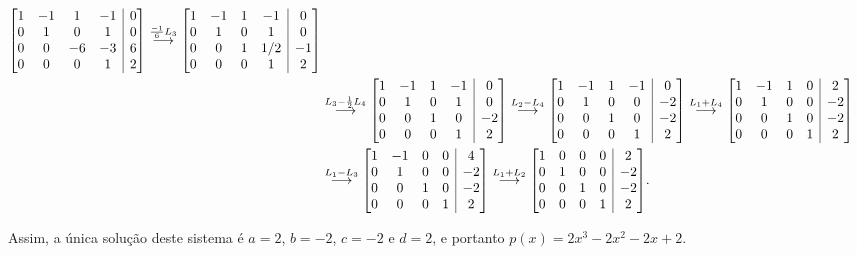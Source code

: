 \documentclass[12pt,a4paper]{article}
\makeatletter
\newenvironment{amatrix}[1]{%
  \left[\begin{array}{@{}*{#1}{c}|c@{}}
}{%
  \end{array}\right]
}
\newcommand{\grstep}[2][\relax]{%
   \ensuremath{\mathrel{
       {\mathop{\longrightarrow}\limits^{#2\mathstrut}_{
                                     \begin{subarray}{l} #1 \end{subarray}}}}}}
\makeatother
\begin{document}
\begin{enumerate}
\begin{align*}
\begin{amatrix}{4}
 1 & -1 & 1 & -1 & 0 \\
 0 &  1 & 0 &  1 & 0 \\
 0 &  0 & -6 & -3 & 6 \\
 0 &  0 & 0 &  1 & 2
\end{amatrix}
\grstep{ \frac{-1}{6}L_3 }
\begin{amatrix}{4}
 1 & -1 & 1 & -1 & 0 \\
 0 &  1 & 0 &  1 & 0 \\
 0 &  0 & 1 & 1/2 & -1 \\
 0 &  0 & 0 &  1 & 2
\end{amatrix}\\
&
\grstep{ L_3 - \frac{1}{2} L_4 }
\begin{amatrix}{4}
 1 & -1 & 1 & -1 & 0 \\
 0 &  1 & 0 &  1 & 0 \\
 0 &  0 & 1 &  0 & -2 \\
 0 &  0 & 0 &  1 & 2
\end{amatrix}
\grstep{ L_2 - L_4 }
\begin{amatrix}{4}
 1 & -1 & 1 & -1 & 0 \\
 0 &  1 & 0 &  0 & -2 \\
 0 &  0 & 1 &  0 & -2 \\
 0 &  0 & 0 &  1 & 2
\end{amatrix}
\grstep{ L_1 + L_4 }
\begin{amatrix}{4}
 1 & -1 & 1 & 0 & 2 \\
 0 &  1 & 0 & 0 & -2 \\
 0 &  0 & 1 & 0 & -2 \\
 0 &  0 & 0 & 1 & 2
\end{amatrix}\\
&
\grstep{ L_1 - L_3 }
\begin{amatrix}{4}
 1 & -1 & 0 & 0 & 4 \\
 0 &  1 & 0 & 0 & -2 \\
 0 &  0 & 1 & 0 & -2 \\
 0 &  0 & 0 & 1 & 2
\end{amatrix}
\grstep{ L_1 + L_2 }
\begin{amatrix}{4}
 1 & 0 & 0 & 0 & 2 \\
 0 & 1 & 0 & 0 & -2 \\
 0 & 0 & 1 & 0 & -2 \\
 0 & 0 & 0 & 1 & 2
\end{amatrix}.
\end{align*}


Assim, a única solução deste sistema é $a=2$, $b=-2$, $c=-2$ e $d=2$, e portanto $p(x) = 2x^3-2x^2-2x+2$.


\end{enumerate}
\end{document}

